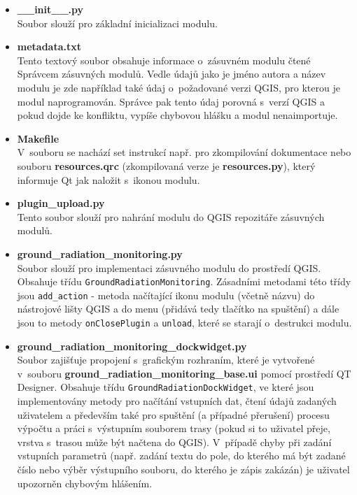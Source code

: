 \begin{itemize}
	\item \textbf{\_\_init\_\_.py} \\ Soubor slouží pro základní
inicializaci modulu.
		 
	\item \textbf{metadata.txt} \\ Tento textový soubor obsahuje
informace o~zásuvném modulu čtené Správcem zásuvných modulů. Vedle
údajů jako je jméno autora a název modulu je zde například také údaj
o~požadované verzi QGIS, pro kterou je modul naprogramován. Správce
pak tento údaj porovná s~verzí QGIS a pokud dojde ke konfliktu, vypíše
chybovou hlášku a modul nenaimportuje.
	
	\item \textbf{Makefile} \\ V~souboru se nachází set instrukcí
např. pro zkompilování dokumentace nebo souboru \textbf{resources.qrc}
(zkompilovaná verze je \textbf{resources.py}), který informuje Qt jak
naložit s~ikonou modulu.
		
	\item \textbf{plugin\_upload.py} \\ Tento soubor slouží pro
nahrání modulu do QGIS repozitáře zásuvných modulů.

	\item \textbf{ground\_radiation\_monitoring.py} \\ Soubor
slouží pro implementaci zásuvného modulu do prostředí QGIS. Obsahuje
třídu \texttt{GroundRadiationMonitoring}. Zásadními metodami této
třídy jsou \texttt{add\_action} - metoda načítající ikonu modulu
(včetně názvu) do nástrojové lišty QGIS a do menu (přidává tedy
tlačítko na spuštění) a dále jsou to metody \texttt{onClosePlugin} a
\texttt{unload}, které se starají o~destrukci modulu.

	\item \textbf{ground\_radiation\_monitoring\_dockwidget.py} \\
Soubor zajišťuje propojení s~grafickým rozhraním, které je vytvořené
v~souboru \textbf{ground\_radiation\_monitoring\_base.ui} pomocí
prostředí QT Designer. Obsahuje třídu
\texttt{GroundRadiationDockWidget}, ve které jsou implementovány metody
pro načítání vstupních dat, čtení údajů zadaných uživatelem a
především také pro spuštění (a případné přerušení) procesu výpočtu a
práci s~výstupním souborem trasy (pokud si to uživatel přeje, vrstva
s~trasou může být načtena do QGIS). V~případě chyby při zadání
vstupních parametrů (např. zadání textu do pole, do kterého má být
zadané číslo nebo výběr výstupního souboru, do kterého je zápis
zakázán) je uživatel upozorněn chybovým hlášením.
	

\end{itemize}

